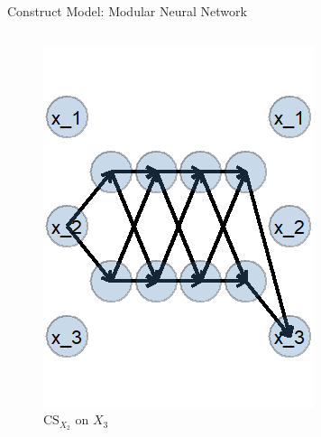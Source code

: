 \documentclass[onlytextwidth,english]{beamer}\usepackage[]{graphicx}\usepackage[]{xcolor}
\begin{document}
\begin{frame}{Construct Model: Modular Neural Network}
\begin{columns}
\begin{column}{0.35\textwidth}
\begin{figure}
  \centering
  \includegraphics[width=0.65\linewidth]{img/CS.png}
  \caption{$\text{CS}_{X_2}$ on $X_3$}
\end{figure}
\end{column}

\end{columns}

\end{frame}
\end{document}
